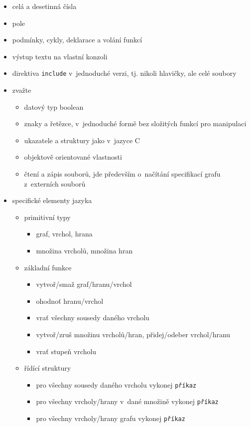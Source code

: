 \documentclass[11pt,twoside,a4paper]{book}
\begin{document}
\begin{itemize}
\item celá a desetinná čísla
\item pole
\item podmínky, cykly, deklarace a volání funkcí
\item výstup textu na vlastní konzoli
\item direktiva \texttt{include} v~jednoduché verzi, tj. nikoli hlavičky, ale celé soubory

\item zvažte
	\begin{itemize}
	\item datový typ boolean
	\item znaky a řetězce, v~jednoduché formě bez složitých funkcí pro manipulaci
	\item ukazatele a struktury jako v~jazyce C
	\item objektově orientované vlastnosti
	\item čtení a zápis souborů, jde především o~načítání specifikací grafu z~externích souborů
	\end{itemize}

\item specifické elementy jazyka
	\begin{itemize}
	\item primitivní typy
		\begin{itemize}
		\item graf, vrchol, hrana
		\item množina vrcholů, množina hran
		\end{itemize}
	\item základní funkce
		\begin{itemize}
		\item vytvoř/smaž graf/hranu/vrchol
		\item ohodnoť hranu/vrchol
		\item vrať všechny sousedy daného vrcholu
		\item vytvoř/zruš množinu vrcholů/hran, přidej/odeber vrchol/hranu
		\item vrať stupeň vrcholu
		\end{itemize}
	\item řídící struktury
		\begin{itemize}
		\item pro všechny sousedy daného vrcholu vykonej \texttt{příkaz}
		\item pro všechny vrcholy/hrany v~dané množině vykonej \texttt{příkaz}
		\item pro všechny vrcholy/hrany grafu vykonej \texttt{příkaz}
		\end{itemize}
	\end{itemize}
\end{itemize}
\end{document}

